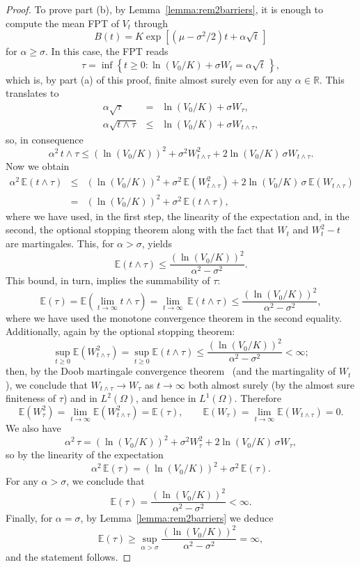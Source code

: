 \documentclass[12pt]{article}
\theoremstyle{definition}
\begin{document}
\begin{proof}
To prove part (b), by Lemma~\ref{lemma:rem2barriers}, it is enough to compute the mean FPT of $V_t$ through
$$
B(t) = K \exp \left[(\mu-\sigma^2/2)t + \alpha \sqrt{t} \, \right]
$$
for $\alpha \ge \sigma$. In this case, the FPT reads
$$
\tau=\inf \left\{t \ge 0 : \ln(V_0/K) + \sigma W_t = \alpha \sqrt{t} \, \right\},
$$
which is, by part (a) of this proof, finite almost surely even for any $\alpha \in \mathbb{R}$.
This translates to
\begin{eqnarray}\nonumber
\alpha \sqrt{\tau} &=& \ln(V_0/K) + \sigma W_\tau, \\ \nonumber
\alpha \sqrt{t \wedge \tau} &\le& \ln(V_0/K) + \sigma W_{t \wedge \tau},
\end{eqnarray}
so, in consequence
$$
\alpha^2 \, t \wedge \tau \le (\ln(V_0/K))^2 + \sigma^2 W_{t \wedge \tau}^2 + 2 \ln(V_0/K) \, \sigma W_{t \wedge \tau}.
$$
Now we obtain
\begin{eqnarray}\nonumber
\alpha^2 \, \mathbb{E} (t \wedge \tau) &\le& (\ln(V_0/K))^2 + \sigma^2 \, \mathbb{E}(W_{t \wedge \tau}^2) + 2 \ln(V_0/K) \, \sigma \, \mathbb{E} (W_{t \wedge \tau}) \\ \nonumber
&=& (\ln(V_0/K))^2 + \sigma^2 \, \mathbb{E}(t \wedge \tau),
\end{eqnarray}
where we have used, in the first step, the linearity of the expectation and, in the second, the optional stopping theorem along with the fact that $W_t$ and $W_t^2 -t$ are martingales. This, for $\alpha > \sigma$, yields
$$
\mathbb{E} (t \wedge \tau) \le \frac{(\ln(V_0/K))^2}{\alpha^2 - \sigma^2}.
$$
This bound, in turn, implies the summability of $\tau$:
$$
\mathbb{E} (\tau) = \mathbb{E} \left( \lim_{t \to \infty} t \wedge \tau \right) = \lim_{t \to \infty} \,
\mathbb{E} (t \wedge \tau) \le \frac{(\ln(V_0/K))^2}{\alpha^2 - \sigma^2},
$$
where we have used the monotone convergence theorem in the second equality.
Additionally, again by the optional stopping theorem:
$$
\sup_{t \ge 0} \mathbb{E}(W_{t \wedge \tau}^2) = \sup_{t \ge 0} \mathbb{E}(t \wedge \tau) \le \frac{(\ln(V_0/K))^2}{\alpha^2 - \sigma^2} < \infty;
$$
then, by the Doob martingale convergence theorem~\cite{revuz2013continuous} (and the martingality of $W_t$), we conclude that $W_{t \wedge \tau} \to W_\tau$ as $t \to \infty$ both almost surely (by the almost sure finiteness of $\tau$) and in $L^2(\Omega)$, and hence in $L^1(\Omega)$. Therefore
$$
\mathbb{E}(W_{\tau}^2) = \lim_{t \to \infty} \mathbb{E}(W_{t \wedge \tau}^2) = \mathbb{E}(\tau), \qquad \mathbb{E}(W_{\tau}) = \lim_{t \to \infty} \mathbb{E}(W_{t \wedge \tau}) = 0.
$$
We also have
$$
\alpha^2 \, \tau = (\ln(V_0/K))^2 + \sigma^2 W_{\tau}^2 + 2 \ln(V_0/K) \, \sigma W_{\tau},
$$
so by the linearity of the expectation
$$
\alpha^2 \, \mathbb{E}(\tau) = (\ln(V_0/K))^2 + \sigma^2 \, \mathbb{E}(\tau). 
$$
For any $\alpha > \sigma$, we conclude that
$$
\mathbb{E}(\tau) = \frac{(\ln(V_0/K))^2}{\alpha^2 - \sigma^2} < \infty.
$$
Finally, for $\alpha = \sigma$, by Lemma~\ref{lemma:rem2barriers} we deduce
$$
\mathbb{E}(\tau) \ge \sup_{\alpha > \sigma} \frac{(\ln(V_0/K))^2}{\alpha^2 - \sigma^2} = \infty,
$$
and the statement follows.
\end{proof}
\end{document}
